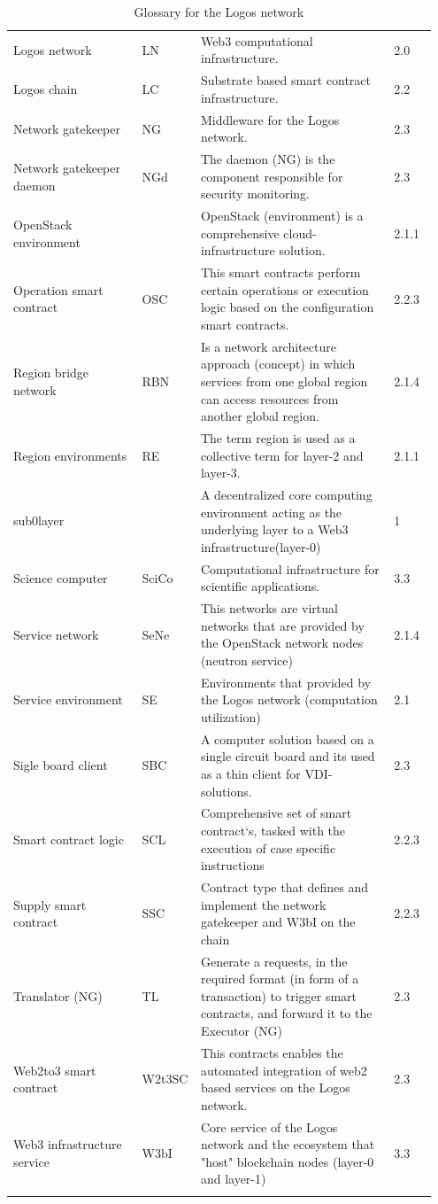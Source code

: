 \documentclass[]{article}
\begin{document}
\begin{longtable}{p{0.3\linewidth} p{0.1\linewidth} p{0.45\linewidth} p{0.1\linewidth}}
Logos network & LN & Web3 computational infrastructure. & 2.0 \\ %
Logos chain & LC & Substrate based smart contract infrastructure. & 2.2 \\ %
Network gatekeeper & NG & Middleware for the Logos network. & 2.3 \\ %
Network gatekeeper daemon & NGd & The daemon (NG) is the component responsible for security monitoring. & 2.3 \\ %
OpenStack environment & & OpenStack (environment) is a comprehensive cloud-infrastructure solution. & 2.1.1 \\ %
Operation smart contract & OSC & This smart contracts perform certain operations or execution logic based on the configuration smart contracts. & 2.2.3 \\ %
Region bridge network & RBN & Is a network architecture approach (concept) in which services from one global region can access resources from another global region. & 2.1.4 \\ %
Region environments & RE & The term region is used as a collective term for layer-2 and layer-3. & 2.1.1 \\ %
sub0layer & & A decentralized core computing environment acting as the underlying layer to a Web3 infrastructure(layer-0) & 1 \\ %
Science computer & SciCo & Computational infrastructure for scientific applications. & 3.3 \\ %
Service network & SeNe & This networks are virtual networks that are provided by the OpenStack network nodes (neutron service) & 2.1.4 \\ %
Service environment & SE & Environments that provided by the Logos network (computation utilization)  & 2.1 \\ %
Sigle board client & SBC & A computer solution based on a single circuit board and its used as a thin client for VDI-solutions. & 2.3 \\ %
Smart contract logic & SCL & Comprehensive set of smart contract`s, tasked with the execution of case specific instructions & 2.2.3 \\ %
Supply smart contract & SSC & Contract type that defines and implement the network gatekeeper and W3bI on the chain & 2.2.3 \\ %
Translator (NG) & TL & Generate a requests, in the required format (in form of a transaction) to trigger smart contracts, and forward it to the Executor (NG) & 2.3 \\ %
Web2to3 smart contract & W2t3SC & This contracts enables the automated integration of web2 based services on the Logos network. & 2.3 \\ %
Web3 infrastructure service & W3bI & Core service of the Logos network and the ecosystem that "host" blockchain nodes (layer-0 and layer-1) & 3.3 \\ %

	\caption{Glossary for the Logos network}
\end{longtable}
\end{document}
